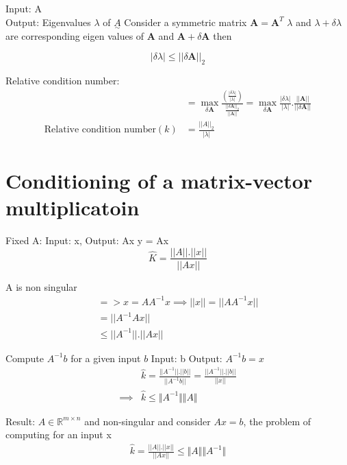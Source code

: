 \documentclass{article}
\begin{document}
Input: A\\
Output: Eigenvalues $\lambda$ of $\underset{\sim}{A}$
\newline\newline
Consider a symmetric matrix $\mathbf{A} = \mathbf{A}^T$
$\lambda$ and $\lambda + \delta\lambda$ are corresponding eigen values of \textbf{A} and $\mathbf{A} + \delta\mathbf{A}$ then

\begin{equation}
|\delta\lambda| \leq ||\delta\mathbf{A}||_2
\end{equation}

Relative condition number:
\begin{equation}
 \begin{split}
    &= \max_{\delta\mathbf{A}}\frac{\left(\frac{|\delta\lambda|}{|\lambda|}\right)}{\frac{||\delta\mathbf{A}||_2}{||\mathbf{A||}}}
    = \max_{\delta\mathbf{A}}\frac{|\delta\lambda|}{|\lambda|}.\frac{||\mathbf{A}||}{||\delta\mathbf{A}||}\\
      \text{Relative condition number}(k) &= \frac{||A||_2}{|\lambda|}
 \end{split}
\end{equation}

\section{Conditioning of a matrix-vector multiplicatoin}
\label{sec:cond-matr-vect}
Fixed A:
Input: x, Output: Ax
y = Ax
\[\hat{K} = \frac{||A||.||x||}{||Ax||}\]
\newline

A is non singular
\[
\begin{split}
=> x = A A^{-1}x
\implies ||x|| = ||A A^{-1} x||\\
               = ||A^{-1} A x||\\
               \leq ||A^{-1}||.||A x||
\end{split}
\]
\newline

Compute $A^{-1}b$ for a given input $b$
Input: b
Output: $A^{-1}b = x$
\begin{align*}
  &\hat{k} = \frac{||A^{-1}||.||b||}{||A^{-1}b||} = \frac{||A^{-1}||.||b||}{||x||}\\
  \implies &\hat{k} \leq \Vert A^{-1}\Vert\Vert A\Vert
\end{align*}

Result: $A\in \mathbb{R}^{m\times n}$ and non-singular and consider $Ax = b$, the problem of computing for an input x
\begin{align*}
  \hat{k} = \frac{||A||.||x||}{||Ax||} \leq \Vert A\Vert\Vert A^{-1}\Vert
\end{align*}
\end{document}
